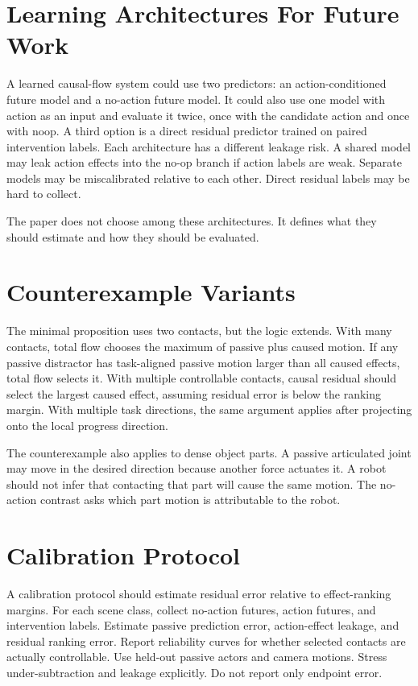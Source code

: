 \documentclass{article}
\begin{document}
\section{Learning Architectures For Future Work}

A learned causal-flow system could use two predictors: an action-conditioned future model
and a no-action future model.  It could also use one model with action as an input and
evaluate it twice, once with the candidate action and once with noop.  A third option is a
direct residual predictor trained on paired intervention labels.  Each architecture has a
different leakage risk.  A shared model may leak action effects into the no-op branch if
action labels are weak.  Separate models may be miscalibrated relative to each other.
Direct residual labels may be hard to collect.

The paper does not choose among these architectures.  It defines what they should
estimate and how they should be evaluated.

\section{Counterexample Variants}

The minimal proposition uses two contacts, but the logic extends.  With many contacts,
total flow chooses the maximum of passive plus caused motion.  If any passive distractor
has task-aligned passive motion larger than all caused effects, total flow selects it.
With multiple controllable contacts, causal residual should select the largest caused
effect, assuming residual error is below the ranking margin.  With multiple task
directions, the same argument applies after projecting onto the local progress direction.

The counterexample also applies to dense object parts.  A passive articulated joint may
move in the desired direction because another force actuates it.  A robot should not
infer that contacting that part will cause the same motion.  The no-action contrast asks
which part motion is attributable to the robot.

\section{Calibration Protocol}

A calibration protocol should estimate residual error relative to effect-ranking margins.
For each scene class, collect no-action futures, action futures, and intervention labels.
Estimate passive prediction error, action-effect leakage, and residual ranking error.
Report reliability curves for whether selected contacts are actually controllable.  Use
held-out passive actors and camera motions.  Stress under-subtraction and leakage
explicitly.  Do not report only endpoint error.
\end{document}
